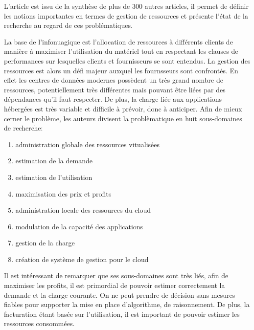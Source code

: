 \documentclass[11pt]{article}
\begin{document}
L'article est issu de la synthèse de plus de 300 autres articles, il permet de définir les notions importantes en termes de
gestion de ressources et présente l'état de la recherche au regard de ces problématiques.

La base de l'infonuagique est l'allocation de ressources à différents clients de manière à maximiser l'utilisation du matériel tout en respectant les clauses de 
performances sur lesquelles clients et fournisseurs se sont entendus. La gestion des ressources est alors un défi majeur auxquel les fournsseurs sont confrontés. En effet
les centres de données modernes possèdent un très grand nombre de ressources, potentiellement très différentes mais pouvant être liées par des dépendances qu'il faut
respecter. De plus, la charge liée aux applications hébergées est très variable et difficile à prévoir, donc à anticiper. Afin de mieux cerner le problème, les auteurs 
divisent la problèmatique en huit sous-domaines de recherche:
\begin{enumerate}
	\item\label{global scheduling}  administration globale des ressources vitualisées
	\item\label{resource demand}estimation de la demande
	\item\label{resource utilization}estimation de l'utilisation
	\item\label{resource pricing}maximisation des prix et profits
	\item\label{local scheduling}administration locale des ressources du cloud
	\item\label{application scaling}modulation de la capacité des applications
	\item\label{workload management}gestion de la charge
	\item\label{cloud management}création de système de gestion pour le cloud
\end{enumerate}
Il est intéressant de remarquer que ses sous-domaines sont très liés, afin de maximiser les profits, il est primordial de pouvoir estimer correctement la demande et la
charge courante. On ne peut prendre de décision sans mesures fiables pour supporter la mise en place d'algorithme, de raisonnement. De plus, la facturation étant basée 
sur l'utilisation, il est important de pouvoir estimer les ressources consommées.
\end{document}
